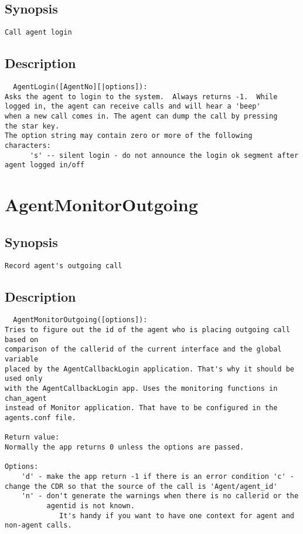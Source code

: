 \subsection{Synopsis}
\begin{verbatim}
Call agent login
\end{verbatim}
\subsection{Description}
\begin{verbatim}
  AgentLogin([AgentNo][|options]):
Asks the agent to login to the system.  Always returns -1.  While
logged in, the agent can receive calls and will hear a 'beep'
when a new call comes in. The agent can dump the call by pressing
the star key.
The option string may contain zero or more of the following characters:
      's' -- silent login - do not announce the login ok segment after agent logged in/off

\end{verbatim}


\section{AgentMonitorOutgoing}
\subsection{Synopsis}
\begin{verbatim}
Record agent's outgoing call
\end{verbatim}
\subsection{Description}
\begin{verbatim}
  AgentMonitorOutgoing([options]):
Tries to figure out the id of the agent who is placing outgoing call based on
comparison of the callerid of the current interface and the global variable 
placed by the AgentCallbackLogin application. That's why it should be used only
with the AgentCallbackLogin app. Uses the monitoring functions in chan_agent 
instead of Monitor application. That have to be configured in the agents.conf file.

Return value:
Normally the app returns 0 unless the options are passed.

Options:
	'd' - make the app return -1 if there is an error condition	'c' - change the CDR so that the source of the call is 'Agent/agent_id'
	'n' - don't generate the warnings when there is no callerid or the
	      agentid is not known.
             It's handy if you want to have one context for agent and non-agent calls.

\end{verbatim}



